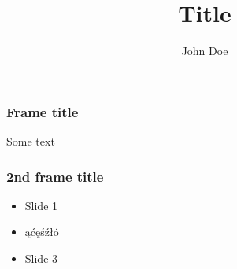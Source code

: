 \documentclass{beamer}
\title{Title}
\author{John Doe}
\date{}
\begin{document}
\frame{\titlepage}

\begin{frame}
    \frametitle{Frame title}
    Some text
\end{frame}

\begin{frame}
    \frametitle{2nd frame title}
    
    \begin{itemize}
     \item<1-> Slide 1
     \item<2> ąćęśźłó
     \item<3-> Slide 3
    \end{itemize}
\end{frame}
\end{document}

